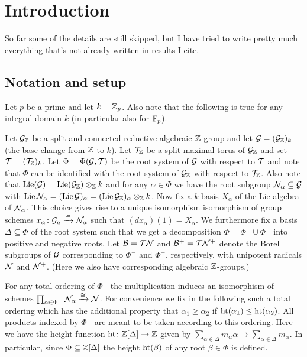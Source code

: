 
\section{Introduction}

So far some of the details are still skipped, but I have tried to write pretty much everything that's not already written in results I cite.

\subsection{Notation and setup}

Let $p$ be a prime and let $k = \mathbb{Z}_p$. Also note that the following is true for any integral domain $k$ (in particular also for $\mathbb{F}_p$).

Let $\mathcal{G}_{\mathbb{Z}}$ be a split and connected reductive algebraic $\mathbb{Z}$-group and let $\mathcal{G} = (\mathcal{G}_{\mathbb{Z}})_{k}$ (the base change from $\mathbb{Z}$ to $k$). Let $\mathcal{T}_{\mathbb{Z}}$ be a split maximal torus of $\mathcal{G}_{\mathbb{Z}}$ and set $\mathcal{T} = (\mathcal{T}_{\mathbb{Z}})_{k}$. Let $\Phi = \Phi(\mathcal{G},\mathcal{T})$ be the root system of $\mathcal{G}$ with respect to $\mathcal{T}$ and note that $\Phi$ can be identified with the root system of $\mathcal{G}_{\mathbb{Z}}$ with respect to $\mathcal{T}_{\mathbb{Z}}$. Also note that $\operatorname{Lie}(\mathcal{G}) = \operatorname{Lie}(\mathcal{G}_{\mathbb{Z}}) \otimes_{\mathbb{Z}} k$ and for any $\alpha \in \Phi$ we have the root subgroup $\mathcal{N}_\alpha \subseteq \mathcal{G}$ with $\operatorname{Lie} \mathcal{N}_\alpha = (\operatorname{Lie} \mathcal{G})_\alpha = (\operatorname{Lie} \mathcal{G}_{\mathbb{Z}})_\alpha \otimes_{\mathbb{Z}} k$. Now fix a $k$-basis $X_\alpha$ of the Lie algebra of $\mathcal{N}_\alpha$. This choice gives rise to a unique isomorphism isomorphism of group schemes $x_\alpha \colon \mathcal{G}_a \xrightarrow{\cong} \mathcal{N}_\alpha$ such that $(dx_\alpha)(1) = X_\alpha$. We furthermore fix a basis $\Delta \subseteq \Phi$ of the root system such that we get a decomposition $\Phi = \Phi^+ \cup \Phi^-$ into positive and negative roots. Let $\mathcal{B} = \mathcal{T}\mathcal{N}$ and $\mathcal{B}^+ = \mathcal{T}\mathcal{N}^+$ denote the Borel subgroups of $\mathcal{G}$ corresponding to $\Phi^-$ and $\Phi^+$, respectively, with unipotent radicals $\mathcal{N}$ and $\mathcal{N}^+$. (Here we also have corresponding algebraic $\mathbb{Z}$-groups.)

For any total ordering of $\Phi^-$ the multiplication induces an isomorphism of schemes $\prod_{\alpha \in \Phi^-} \mathcal{N}_\alpha \xrightarrow{\cong} \mathcal{N}$. For convenience we fix in the following such a total ordering which has the additional property that $\alpha_1 \geq \alpha_2$ if $\operatorname{ht}(\alpha_1) \leq \operatorname{ht}(\alpha_2)$. All products indexed by $\Phi^-$ are meant to be taken according to this ordering. Here we have the height function $\operatorname{ht} \colon \mathbb{Z}[\Delta] \to \mathbb{Z}$ given by $\sum_{\alpha \in \Delta} m_\alpha \alpha \mapsto \sum_{\alpha \in \Delta} m_\alpha$. In particular, since $\Phi \subseteq \mathbb{Z}[\Delta]$ the height $\operatorname{ht}(\beta)$ of any root $\beta \in \Phi$ is defined.

